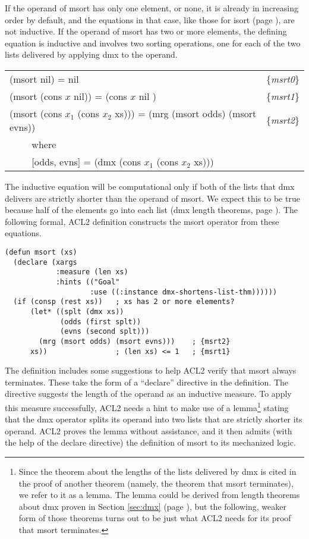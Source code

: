 If the operand of msort has only one element, or none,
it is already in increasing order by default,
and the equations in that case,
like those for isort (page \pageref{eq:isrt0}),
are not inductive.
If the operand of msort has two or more elements,
the defining equation is inductive and
involves two sorting operations,
one for each of the two lists delivered by applying
dmx to the operand.

\begin{center}
\label{eq:msrt1}
\label{eq:msrt0}
\label{eq:msrt2}
\begin{tabular}{ll}
(msort nil) = nil                        & \{\emph{msrt0}\} \\
(msort (cons $x$ nil)) = (cons $x$ nil ) & \{\emph{msrt1}\} \\
(msort (cons $x_1$ (cons $x_2$ xs))) = (mrg (msort odds) (msort evns)) & \{\emph{msrt2}\} \\
 ~~~~ where  & \\
 ~~~~ [odds, evns] = (dmx (cons $x_1$ (cons $x_2$ xs))) & \\
\end{tabular}
\end{center}

The inductive equation will be computational only if
both of the lists that dmx delivers are strictly
shorter than the operand of msort.
We expect this to be true because half
of the elements go into each list
(dmx length theorems, page \pageref{thm:dmx-length-first-second}).
The following formal, ACL2 definition constructs the msort operator
from these equations.

\label{defun:msort}
\begin{Verbatim}
(defun msort (xs)
  (declare (xargs
            :measure (len xs)
            :hints (("Goal"
                    :use ((:instance dmx-shortens-list-thm))))))
  (if (consp (rest xs))   ; xs has 2 or more elements?
      (let* ((splt (dmx xs))
             (odds (first splt))
             (evns (second splt)))
        (mrg (msort odds) (msort evns)))    ; {msrt2}
      xs))                ; (len xs) <= 1   ; {msrt1}
\end{Verbatim}

The definition includes some suggestions
to help ACL2 verify that msort always terminates.
These take the form of a ``declare'' directive
in the definition.
The directive suggests the length of the operand as an inductive measure.
To apply this measure successfully,
ACL2 needs a hint to make use of a lemma\footnote{Since
the theorem about the lengths of the lists
delivered by dmx is cited in the proof of
another theorem (namely, the theorem that msort terminates),
we refer to it as a lemma.
The lemma could be derived from length theorems about dmx
proven in Section \ref{sec:dmx} (page \pageref{thm:dmx-length-first-second}),
but the following, weaker form of those theorems turns out to be just what
ACL2 needs for its proof that msort terminates.}
stating that the dmx operator splits its
operand into two lists that are strictly shorter its operand.
ACL2 proves the lemma without assistance,
and it then admits (with the help of the declare directive)
the definition of msort to its mechanized logic.

